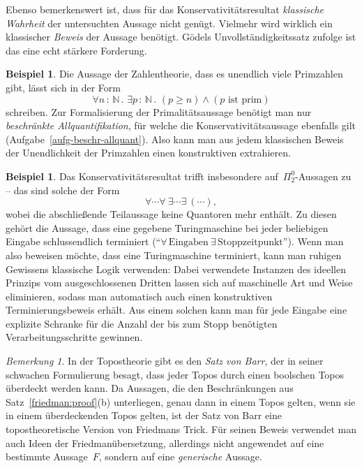 \documentclass[a4paper,ngerman,12pt]{scrartcl}
\theoremstyle{definition}
\newtheorem{bsp}[defn]{Beispiel}
\theoremstyle{plain}
\theoremstyle{remark}
\newtheorem{bem}[defn]{Bemerkung}
\newcommand{\NN}{\mathbb{N}}
\renewcommand{\_}{\mathpunct{.}\,}
\newcommand{\?}{\,{:}\,}
\begin{document}
Ebenso bemerkenswert ist, dass für das Konservativitätsresultat
\emph{klassische Wahrheit} der untersuchten Aussage nicht genügt. Vielmehr wird
wirklich ein klassischer \emph{Beweis} der Aussage benötigt. Gödels
Unvollständigkeitssatz zufolge ist das eine echt stärkere Forderung.

\begin{bsp}Die Aussage der Zahlentheorie, dass es unendlich viele Primzahlen
gibt, lässt sich in der Form
\[ \forall n\?\NN\_ \exists p\?\NN\_ (p \geq n) \wedge (\text{$p$ ist prim}) \]
schreiben. Zur Formalisierung der Primalitätsaussage benötigt man nur
\emph{beschränkte Allquantifikation}, für welche die Konservativitätsaussage
ebenfalls gilt (Aufgabe~\ref{aufg-beschr-allquant}). Also kann man aus jedem klassischen Beweis der Unendlichkeit
der Primzahlen einen konstruktiven extrahieren.
\end{bsp}

\begin{bsp}Das Konservativitätsresultat trifft insbesondere
auf~$\Pi^0_2$-Aussagen zu -- das sind solche der Form
\[ \forall \cdots \forall\ \exists \cdots \exists\ (\cdots), \]
wobei die abschließende Teilaussage keine Quantoren mehr enthält. Zu diesen
gehört die Aussage, dass eine gegebene Turingmaschine bei jeder
beliebigen Eingabe schlussendlich terminiert ("`$\forall\,\text{Eingaben}\
\exists\,\text{Stoppzeitpunkt}$"'). Wenn man also beweisen möchte, dass eine
Turingmaschine terminiert, kann man ruhigen Gewissens klassische Logik
verwenden: Dabei verwendete Instanzen des ideellen Prinzips vom ausgeschlossenen Dritten
lassen sich auf maschinelle Art und Weise eliminieren, sodass man automatisch
auch einen konstruktiven Terminierungsbeweis erhält. Aus einem solchen kann man
für jede Eingabe eine explizite Schranke für die Anzahl der bis zum Stopp
benötigten Verarbeitungsschritte gewinnen.
\end{bsp}

\begin{bem}In der Topostheorie gibt es den \emph{Satz von Barr}, der in seiner
schwachen Formulierung besagt, dass jeder Topos durch einen boolschen Topos
überdeckt werden kann. Da Aussagen, die den Beschränkungen aus
Satz~\ref{friedman:proof}(b) unterliegen, genau dann in einem Topos gelten, wenn sie
in einem überdeckenden Topos gelten, ist der Satz von Barr eine
topostheoretische Version von Friedmans Trick. Für seinen Beweis verwendet man
auch Ideen der Friedmanübersetzung, allerdings nicht angewendet auf eine bestimmte
Aussage~$F$, sondern auf eine \emph{generische} Aussage.\end{bem}
\end{document}
